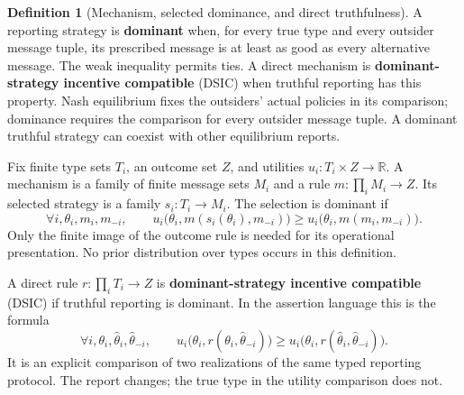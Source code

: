 \documentclass[11pt,a4paper]{article}
\numberwithin{equation}{section}
\theoremstyle{definition}
\newtheorem{definition}[theorem]{Definition}
\theoremstyle{remark}
\theoremstyle{plain}
\begin{document}
\begin{definition}[Mechanism, selected dominance, and direct truthfulness]
\label{def:egt-mechanism-selected-dominance-and-direct-truthfulness}
A reporting strategy is \textbf{dominant} when, for every true type and
every outsider message tuple, its prescribed message is at least as good
as every alternative message. The weak inequality permits ties.
A direct mechanism is \textbf{dominant-strategy incentive compatible}
(DSIC) when truthful reporting has this property.
Nash equilibrium fixes the outsiders' actual policies in its comparison;
dominance requires the comparison for every outsider message tuple.
A dominant truthful strategy can coexist with other equilibrium reports.

Fix finite type sets $T_i$, an outcome set $Z$, and utilities
$u_i:T_i\times Z\to\mathbb R$. A mechanism is a family of finite message
sets $M_i$ and a rule $m:\prod_iM_i\to Z$. Its selected strategy is a
family $s_i:T_i\to M_i$. The selection is dominant if
\begin{equation}
\label{eq:egt-dominant}
 \forall i,\theta_i,m_i,m_{-i},\qquad
 u_i\bigl(\theta_i,m(s_i(\theta_i),m_{-i})\bigr)
 \geq
 u_i\bigl(\theta_i,m(m_i,m_{-i})\bigr).
\end{equation}
Only the finite image of the outcome rule is needed for its operational
presentation. No prior distribution over types occurs in this definition.

A direct rule $r:\prod_iT_i\to Z$ is \textbf{dominant-strategy incentive
compatible} (DSIC) if truthful reporting is dominant. In the assertion
language this is the formula
\[
 \forall i,\theta_i,\widehat\theta_i,\widehat\theta_{-i},\qquad
 u_i\bigl(\theta_i,r(\theta_i,\widehat\theta_{-i})\bigr)
 \geq
 u_i\bigl(\theta_i,r(\widehat\theta_i,\widehat\theta_{-i})\bigr).
\]
It is an explicit comparison of two realizations of the same typed
reporting protocol. The report changes; the true type in the utility
comparison does not.
\end{definition}
\end{document}
